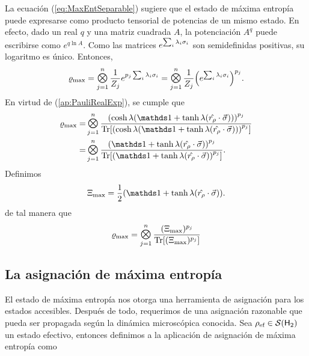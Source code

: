 

La ecuación (\ref{eq:MaxEntSeparable}) sugiere que el estado de máxima entropía puede expresarse como producto tensorial de potencias de un mismo estado. En efecto, dado un real $q$ y una matriz cuadrada $A$, la potenciación $A^{q}$ puede escribirse como $e^{q \ln A}$. Como las matrices $e^{\sum_{i}\lambda_{i}\sigma_{i}}$ son semidefinidas positivas, su logaritmo es único. Entonces,
\begin{equation*}
    \varrho_{\max}=\Motimes_{j=1}^{n}\frac{1}{Z_{j}}e^{p_{j}\sum_{i}\lambda_{i}\pauli{i}}=\Motimes_{j=1}^{n}\frac{1}{Z_{j}}\qty(e^{\sum_{i}\lambda_{i}\pauli{i}})^{p_{j}}.
\end{equation*}
En virtud de (\ref*{ap:PauliRealExp}), se cumple que
\begin{align*}
  \varrho_{\max}=&\Motimes_{j=1}^{n}\frac{\qty(\cosh{\lambda}(\Id+\tanh{\lambda}(\paulivec{r_{\rho}})))^{p_{j}}}{\Tr[\qty(\cosh{\lambda}(\Id+\tanh{\lambda}(\paulivec{r_{\rho}})))^{p_{j}}]}\\
  =&\Motimes_{j=1}^{n}\frac{\qty(\Id+\tanh{\lambda}(\paulivec{r_{\rho}}))^{p_{j}}}{\Tr[\qty(\Id+\tanh{\lambda}(\paulivec{r_{\rho}}))^{p_{j}}]}.
\end{align*}
Definimos
\begin{equation}\label{eq:Xi}
  \Xi_{\max}=\frac{1}{2}(\Id+\tanh{\lambda}(\paulivec{r_{\rho}})).
\end{equation}
de tal manera que 
\begin{equation}\label{eq:MaxEntSeparablePower}
  \varrho_{\max}=\Motimes_{j=1}^{n}\frac{(\Xi_{\max})^{p_{j}}}{\Tr[ (\Xi_{\max})^{p_{j}}]}
\end{equation}

\subsection{La asignación de máxima entropía}

El estado de máxima entropía nos otorga una herramienta de asignación para los estados accesibles. Después de todo, requerimos de una asignación razonable que pueda ser propagada según la dinámica microscópica conocida. Sea $\rho_{\text{ef}}\in\mathcal{S}({\sf H}_{2})$ un estado efectivo, entonces definimos a la aplicación de asignación de máxima entropía como

